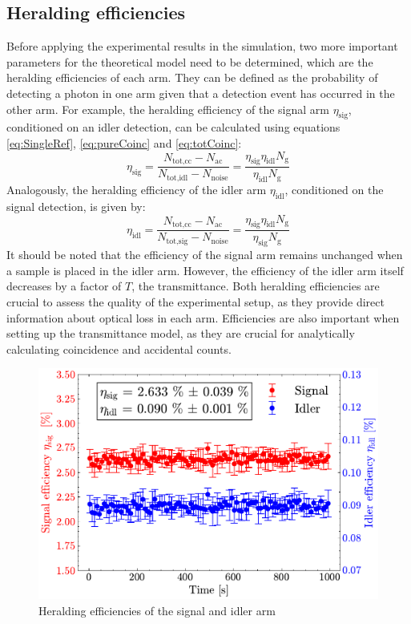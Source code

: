 \subsection{Heralding efficiencies}
Before applying the experimental results in the simulation, two more important parameters for the theoretical model need to be determined, which are the heralding efficiencies of each arm.\newline
They can be defined as the probability of detecting a photon in one arm given that a detection event has occurred in the other arm. For example, the heralding efficiency of the signal arm $\eta_{\text{sig}}$, conditioned on an idler detection, can be calculated using equations \ref{eq:SingleRef}, \ref{eq:pureCoinc} and \ref{eq:totCoinc}:
\begin{equation}
	\eta_{\text{sig}} = \frac{N_{\text{tot,cc}}-N_{\text{ac}}}{N_{\text{tot,idl}}-N_{\text{noise}}} = \frac{\eta_{\text{sig}}\eta_{\text{idl}}N_{\text{g}}}{\eta_{\text{idl}}N_{\text{g}}}
	\label{eq:EffSig}
\end{equation}
Analogously, the heralding efficiency of the idler arm $\eta_{\text{idl}}$, conditioned on the signal detection, is given by:
\begin{equation}
	\eta_{\text{idl}} = \frac{N_{\text{tot,cc}}-N_{\text{ac}}}{N_{\text{tot,sig}}-N_{\text{noise}}} = \frac{\eta_{\text{sig}}\eta_{\text{idl}}N_{\text{g}}}{\eta_{\text{sig}}N_{\text{g}}}
	\label{eq:EffIdl}
\end{equation}
It should be noted that the efficiency of the signal arm remains unchanged when a sample is placed in the idler arm. However, the efficiency of the idler arm itself decreases by a factor of $T$, the transmittance.\newline
Both heralding efficiencies are crucial to assess the quality of the experimental setup, as they provide direct information about optical loss in each arm. Efficiencies are also important when setting up the transmittance model, as they are crucial for analytically calculating coincidence and accidental counts.
\begin{figure}[tb!]
	\centering
	\includegraphics[width=.8\textwidth]{Images/HeraldingEff_2.pdf}
	\caption{Heralding efficiencies of the signal and idler arm}
	\label{fig:HeralEff}
\end{figure} \newline
